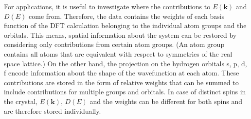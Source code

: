 For applications, it is useful to investigate where the contributions to $E(\mathbf{k})$ and $D(E)$ come from. Therefore, the data contains the weights of each basis function of the DFT calculation belonging to the individual atom groups and the orbitals. This means, spatial information about the system can be restored by considering only contributions from certain atom groups. (An atom group contains all atoms that are equivalent with respect to symmetries of the real space lattice.) On the other hand, the projection on the hydrogen orbitals s, p, d, f encode information about the shape of the wavefunction at each atom. These contributions are stored in the form of relative weights that can be summed to include contributions for multiple groups and orbitals. In case of distinct spins in the crystal, $E(\mathbf{k})$, $D(E)$ and the weights can be different for both spins and are therefore stored individually.



